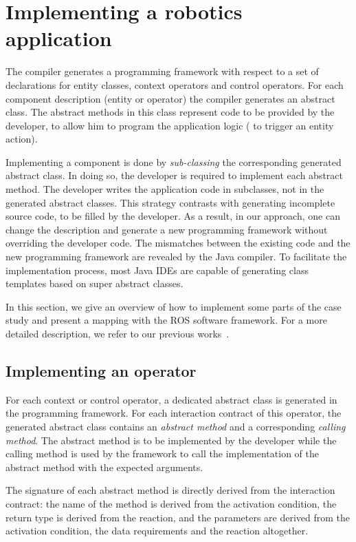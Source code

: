 \section{Implementing a robotics application}
\label{sec:implementing}

The \diaspec{} compiler generates a programming framework with respect
to a set of declarations for entity classes, context operators and
control operators. For each component description (entity or operator)
the compiler generates an abstract class. The abstract methods in this
class represent code to be provided by the developer, to allow him to
program the application logic (\eg{} to trigger an entity action). 

Implementing a \diaspec{} component is done by \textit{sub-classing}
the corresponding generated abstract class. In doing so, the developer
is required to implement each abstract method. The developer writes
the application code in subclasses, not in the generated abstract
classes. This strategy contrasts with generating incomplete source
code, to be filled by the developer. As a result, in our approach, one
can change the \diaspec{} description and generate a new programming
framework without overriding the developer code. The mismatches
between the existing code and the new programming framework are
revealed by the Java compiler. To facilitate the implementation
process, most Java IDEs are capable of generating class templates
based on super abstract classes.

In this section, we give an overview of how to implement some parts of
the case study and present a mapping with the ROS software framework.
For a more detailed description, we refer to our previous
works~\cite{Cass09b,Cass11a,Cass11b}.

\subsection{Implementing an operator}

For each context or control operator, a dedicated abstract class is
generated in the programming framework. For each interaction contract
of this operator, the generated abstract class contains an
\emph{abstract method} and a corresponding \emph{calling method}. The
abstract method is to be implemented by the developer while the
calling method is used by the framework to call the implementation of
the abstract method with the expected arguments.

The signature of each abstract method is directly derived from the
interaction contract: the name of the method is derived from the
activation condition, the return type is derived from the reaction,
and the parameters are derived from the activation condition, the data
requirements and the reaction altogether. 

